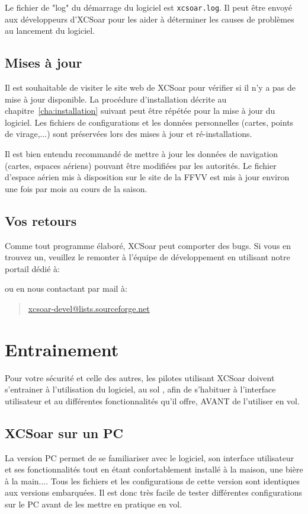 Le fichier de "log" du démarrage du logiciel est \verb|xcsoar.log|. Il peut être envoyé aux développeurs d'XCSoar pour les aider à déterminer les causes de problèmes au lancement du logiciel.

\subsection*{Mises à jour}
Il est souhaitable de visiter le site web de XCSoar pour vérifier si il n'y a pas de mise à jour disponible. La procédure d'installation décrite au chapitre~\ref{cha:installation} suivant peut être répétée pour la mise à jour du logiciel. Les fichiers de configurations et les données personnelles (cartes, points de virage,...) sont préservées lors des mises à jour et ré-installations.

Il est bien entendu recommandé de mettre à jour les données de navigation (cartes, espaces aériens) pouvant être modifiées par les autorités. Le fichier d'espace aérien mis à disposition sur le site de la FFVV est mis à jour environ une fois par mois au cours de la saison.

\subsection*{Vos retours}
Comme tout programme élaboré, XCSoar peut comporter des bugs. Si vous en trouvez un, veuillez le remonter à l'équipe de développement en utilisant notre portail dédié à:
\begin{quote}
\end{quote}
ou en nous contactant par mail à:

\begin{quote}
\href{mailto:xcsoar-devel@lists.sourceforge.net}{xcsoar-devel@lists.sourceforge.net}
\end{quote}

\section{Entrainement}
Pour votre sécurité et celle des autres, les pilotes utilisant XCSoar doivent s'entrainer à l'utilisation du logiciel, au sol , afin de s'habituer à l'interface utilisateur et au différentes fonctionnalités qu'il offre, AVANT de l'utiliser en vol.

\subsection*{XCSoar sur un PC}
La version PC permet de se familiariser avec le logiciel, son interface utilisateur et ses fonctionnalités tout en étant confortablement installé à la maison, une bière à la main.... Tous les fichiers et les configurations de cette version sont identiques aux versions embarquées. Il est donc très facile de tester différentes configurations sur le PC avant de les mettre en pratique en vol.

